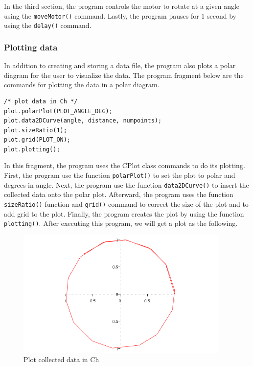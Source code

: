 \documentclass[11pt]{article}
\begin{document}
In the third section, the program controls the motor to rotate at a given angle 
using the {\tt moveMotor()} command. Lastly, the program pauses for 1 second by 
using the {\tt delay()} command.

\subsubsection*{Plotting data}
In addition to creating and storing a data file, the program also plots a polar 
diagram for the user to visualize the data. The program fragment below are the 
commands for plotting the data in a polar diagram.
\begin{lstlisting}
/* plot data in Ch */
plot.polarPlot(PLOT_ANGLE_DEG);
plot.data2DCurve(angle, distance, numpoints);
plot.sizeRatio(1);
plot.grid(PLOT_ON); 
plot.plotting();
\end{lstlisting}
In this fragment, the program uses the CPlot class commands to do its plotting.
First, the program use the function {\tt polarPlot()} to set the plot to polar 
and degrees in angle. Next, the program use the function {\tt data2DCurve()} to 
insert the collected data onto the polar plot. Afterward, the program uses the 
function {\tt sizeRatio()} function and {\tt grid()} command to correct the size 
of the plot and to add grid to the plot. Finally, the program creates the plot 
by using the function {\tt plotting()}. After executing this program, we will get
a plot as the following.
\begin{figure}[h!]
    \begin{center}
    \includegraphics[height=2.5in]{figure/mindstorm/plotData.png}
    \caption{Plot collected data in Ch\label{fig_plot_data}}
\end{center}
\end{figure}
\end{document}
